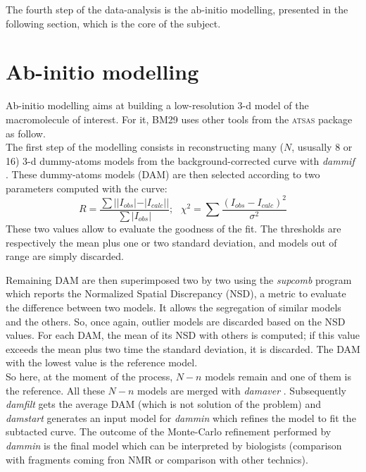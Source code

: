 \documentclass[a4paper, 11pt]{report}
\begin{document}
The fourth step of the data-analysis is the ab-initio modelling, 
presented in the following section, which is the core of the subject.

\section{Ab-initio modelling}
\label{modelling}                           %

Ab-initio modelling aims at building a low-resolution 3-d  
model of the macromolecule of interest. 
For it, BM29 uses other tools from the \textsc{atsas} package as 
follow.\\

The first step of the modelling consists in reconstructing many ($N$, ususally 8
or 16) 3-d dummy-atoms models from the background-corrected curve with 
\textit{dammif} \cite{dammif}. 
These dummy-atoms models (DAM) are then selected according to two 
parameters computed with the curve: 
\[
R = \frac {\sum {||I_{obs}| - |I_{calc}||}}{\sum {|I_{obs}|}}; \ \ \ 
\chi^{2} = \sum {\frac {(I_{obs} - I_{calc})^{2}}{\sigma^{2}}}
\]
These two values allow to evaluate the goodness of the fit. 
The thresholds are respectively the mean plus one or two standard 
deviation, and models out of range are simply discarded.

Remaining DAM are then superimposed two by two using the \textit{supcomb}
\cite{supcomb} program which reports the Normalized Spatial
Discrepancy (NSD), a metric to evaluate the difference between two
models.
It allows the segregation of similar models and the others. 
So, once again, outlier models are discarded based on the NSD
values.
For each DAM, the mean of its NSD with others is computed; 
if this value exceeds the mean plus two time the standard 
deviation, it is discarded. 
The DAM with the lowest value is the reference model.\\

So here, at the moment of the process, $N - n$ models remain and one 
of them is the reference. 
All these $N - n$ models are merged with \textit{damaver} 
\cite{damaver}. 
Subsequently \textit{damfilt} gets the average DAM (which is not solution of
the problem) and \textit{damstart} generates an input model for 
\textit{dammin} \cite{dammin} which refines the model to fit the 
subtacted curve. 
The outcome of the Monte-Carlo refinement performed by \textit{dammin} is the
final model which can be interpreted by biologists (comparison with fragments
coming fron NMR or comparison with other technics).
\end{document}
